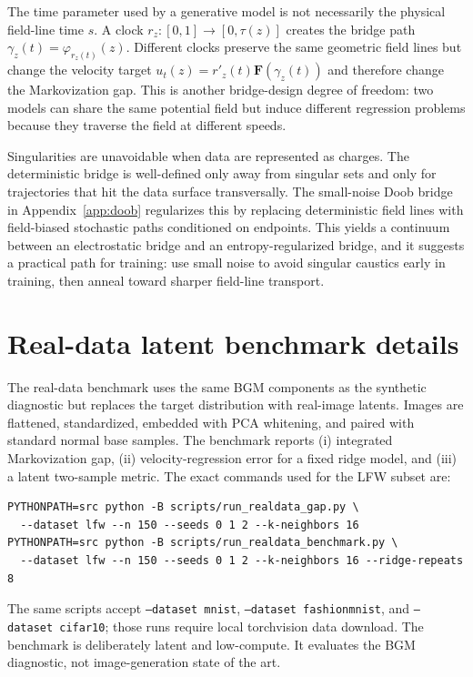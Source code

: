 \documentclass{article}
\numberwithin{equation}{section}
\newcommand{\F}{\bm F}
\begin{document}
The time parameter used by a generative model is not necessarily the physical field-line time \(s\). A clock \(r_z:[0,1]\to[0,\tau(z)]\) creates the bridge path \(\gamma_z(t)=\varphi_{r_z(t)}(z)\). Different clocks preserve the same geometric field lines but change the velocity target \(u_t(z)=r'_z(t)\F(\gamma_z(t))\) and therefore change the Markovization gap. This is another bridge-design degree of freedom: two models can share the same potential field but induce different regression problems because they traverse the field at different speeds.

Singularities are unavoidable when data are represented as charges. The deterministic bridge is well-defined only away from singular sets and only for trajectories that hit the data surface transversally. The small-noise Doob bridge in Appendix~\ref{app:doob} regularizes this by replacing deterministic field lines with field-biased stochastic paths conditioned on endpoints. This yields a continuum between an electrostatic bridge and an entropy-regularized bridge, and it suggests a practical path for training: use small noise to avoid singular caustics early in training, then anneal toward sharper field-line transport.


\section{Real-data latent benchmark details}
\label{app:realdata}

The real-data benchmark uses the same BGM components as the synthetic diagnostic but replaces the target distribution with real-image latents. Images are flattened, standardized, embedded with PCA whitening, and paired with standard normal base samples. The benchmark reports (i) integrated Markovization gap, (ii) velocity-regression error for a fixed ridge model, and (iii) a latent two-sample metric. The exact commands used for the LFW subset are:
\begin{verbatim}
PYTHONPATH=src python -B scripts/run_realdata_gap.py \
  --dataset lfw --n 150 --seeds 0 1 2 --k-neighbors 16
PYTHONPATH=src python -B scripts/run_realdata_benchmark.py \
  --dataset lfw --n 150 --seeds 0 1 2 --k-neighbors 16 --ridge-repeats 8
\end{verbatim}
The same scripts accept \texttt{--dataset mnist}, \texttt{--dataset fashionmnist}, and \texttt{--dataset cifar10}; those runs require local torchvision data download. The benchmark is deliberately latent and low-compute. It evaluates the BGM diagnostic, not image-generation state of the art.
\end{document}
